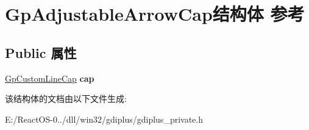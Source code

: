 \hypertarget{struct_gp_adjustable_arrow_cap}{}\section{Gp\+Adjustable\+Arrow\+Cap结构体 参考}
\label{struct_gp_adjustable_arrow_cap}
\subsection*{Public 属性}
\begin{DoxyCompactItemize}
\item 
\mbox{\label{struct_gp_adjustable_arrow_cap_ad53f48939e9ce147f9f1a121adad0e11}} 
\hyperlink{struct_gp_custom_line_cap}{Gp\+Custom\+Line\+Cap} {\bfseries cap}
\end{DoxyCompactItemize}


该结构体的文档由以下文件生成\+:\begin{DoxyCompactItemize}
\item 
E\+:/\+React\+O\+S-\/0../dll/win32/gdiplus/gdiplus\+\_\+private.\+h\end{DoxyCompactItemize}

